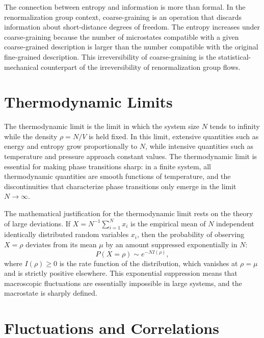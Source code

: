 \documentclass[11pt, twoside, openright]{book}
\theoremstyle{dotted}
\theoremstyle{definition}
\begin{document}
The connection between entropy and information is more than formal. In the
renormalization group context, coarse-graining is an operation that discards
information about short-distance degrees of freedom. The entropy increases under
coarse-graining because the number of microstates compatible with a given
coarse-grained description is larger than the number compatible with the original
fine-grained description. This irreversibility of coarse-graining is the
statistical-mechanical counterpart of the irreversibility of renormalization
group flows.

\section{Thermodynamic Limits}

The thermodynamic limit is the limit in which the system size $N$ tends to infinity
while the density $\rho = N/V$ is held fixed. In this limit, extensive quantities
such as energy and entropy grow proportionally to $N$, while intensive quantities
such as temperature and pressure approach constant values. The thermodynamic
limit is essential for making phase transitions sharp: in a finite system, all
thermodynamic quantities are smooth functions of temperature, and the
discontinuities that characterize phase transitions only emerge in the limit
$N \to \infty$.

The mathematical justification for the thermodynamic limit rests on the theory
of large deviations. If $X = N^{-1}\sum_{i=1}^N x_i$ is the empirical mean of
$N$ independent identically distributed random variables $x_i$, then the
probability of observing $X = \rho$ deviates from its mean $\mu$ by an amount
suppressed exponentially in $N$:
\begin{equation}
  P(X = \rho) \sim e^{-N I(\rho)},
\end{equation}
where $I(\rho) \geq 0$ is the rate function of the distribution, which vanishes
at $\rho = \mu$ and is strictly positive elsewhere. This exponential suppression
means that macroscopic fluctuations are essentially impossible in large systems,
and the macrostate is sharply defined.

\section{Fluctuations and Correlations}
\end{document}

